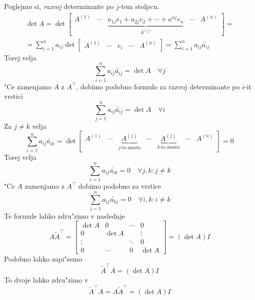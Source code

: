 \begin{enumerate}
	Poglejmo si, \emph{razvoj} determinante po $j$-tem stolpcu.
	\begin{multline*}
	\det A = \det \begin{bmatrix}
	A^{(1)} &
	\cdots &
	\underbrace{a_{1j} e_1 + a_{2j} e_2 + \cdots + a^{nj} e_n}_{A^{(j)}} &
	\cdots &
	A^{(n)}
	\end{bmatrix} = \\
	= \sum_{i = 1}^n a_{ij} \det \begin{bmatrix}A^{(1)} & \cdots & e_i & \cdots & A^{(n)}\end{bmatrix} = \sum_{i = 1}^{n} a_{ij} \widetilde{a_{ij}}
	\end{multline*}
	Torej velja
	\begin{equation*}
	\sum_{i=1}^{n} a_{ij} \widetilde{a_{ij}} = \det A \quad \forall j
	\end{equation*}
	"Ce zamenjamo $A$ z $A^\intercal$, dobimo podobno formulo za razvoj determinante po $i$-it vrstici
	\begin{equation*}
	\sum_{j=1}^{n} a_{ij} \widetilde{a_{ij}} = \det A \quad \forall i
	\end{equation*}
	Za $j \neq k$ velja
	\begin{equation*}
	\sum_{i = 1}^{n} a_{ij} \widetilde{a_{ik}} = \det \begin{bmatrix}
	A^{(1)} & \cdots & \underbrace{A^{(j)}}_{\text{$j$-to mesto}} & \cdots & \underbrace{A^{(j)}}_{\text{$k$-to mesto}} & \cdots & A^{(n)}
	\end{bmatrix} = 0
	\end{equation*}
	Torej velja
	\begin{equation*}
	\sum_{i = 1}^{n} a_{ij} \widetilde{a_{ik}} = 0 \quad \forall j, k: j \neq k
	\end{equation*}
	"Ce $A$ zamenjamo z $A^\intercal$ dobimo podobno za vrstice
	\begin{equation*}
	\sum_{j=1}^n a_{ij} \widetilde{a_{kj}} = 0 \quad \forall i, k: i \neq k
	\end{equation*}
	Te formule lahko zdru"zimo v naslednje
	\begin{equation*}
	A \widetilde{A}^\intercal =
	\begin{bmatrix}
	\det A	&	0	 &	\cdots	&	0 \\
	0		  &\det A&              & \vdots \\
	\vdots &   		 &  \ddots  &  0 \\
	0         &\cdots&   0        & \det A
	\end{bmatrix} = (\det A) I
	\end{equation*}
	Podobno lahko zapi"semo
	\begin{equation*}
	\widetilde{A}^\intercal A = (\det A) I
	\end{equation*}
	To dvoje lahko zdru"zimo v
	\begin{equation*}
	\widetilde{A}^\intercal A = A \widetilde{A}^\intercal = (\det A) I
	\end{equation*}
	

\end{enumerate}
